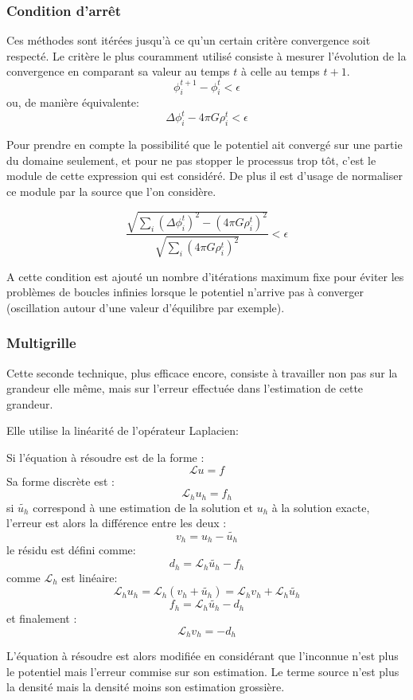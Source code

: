 \subsubsection{Condition d'arrêt}
Ces méthodes sont itérées jusqu’à ce qu'un certain critère convergence soit respecté. Le critère le plus couramment utilisé consiste à mesurer l'évolution de la convergence en comparant sa valeur au temps $t$ à celle au temps $t+1$.
\[ \phi^{t+1}_i - \phi^{t}_i < \epsilon \]
ou, de manière équivalente:
\[ \Delta \phi_i^t - 4 \pi G \rho^t_i< \epsilon \]

Pour prendre en compte la possibilité que le potentiel ait convergé sur une partie du domaine seulement, et pour ne pas stopper le processus trop tôt, c'est le module de cette expression qui est considéré. De plus il est d'usage de normaliser ce module par la source que l'on considère.

\[\dfrac{ \sqrt{  \sum_i \left (  \Delta \phi_i^t \right )^2 - \left (4 \pi G \rho^t_i  \right )^2 } }{\sqrt{  \sum_i  \left (4 \pi G \rho^t_i  \right )^2 } } < \epsilon \]

A cette condition est ajouté un nombre d'itérations maximum fixe pour éviter les problèmes de boucles infinies lorsque le potentiel n'arrive pas à converger (oscillation autour d'une valeur d'équilibre par exemple).

\subsubsection{Multigrille}
Cette seconde technique, plus efficace encore, consiste à travailler non pas sur la grandeur elle même, mais sur l'erreur effectuée dans l'estimation de cette grandeur.

Elle utilise la linéarité de l'opérateur Laplacien: 
 
Si l'équation à résoudre est de la forme : 
\[ \mathcal{L} u = f \]
Sa forme discrète est :\\
\[ \mathcal{L}_h u_h = f_h \]
si $\tilde{u_h}$ correspond à une estimation de la solution et $u_h$ à la solution exacte, l'erreur est alors la différence entre les deux : 
\[ v_h = u_h - \tilde{u_h} \]
le résidu est défini comme:
\[ d_h = \mathcal{L}_h \tilde{u_h} - f_h \]
comme $\mathcal{L}_h$ est linéaire:
\[ \mathcal{L}_h u_h = \mathcal{L}_h (v_h + \tilde{u_h} ) = \mathcal{L}_h v_h +\mathcal{L}_h \tilde{u_h} \]
\[ f_h   = \mathcal{L}_h \tilde{u_h} - d_h\]
et finalement :
\[ \mathcal{L}_h v_h = -d_h \]

L'équation à résoudre est alors modifiée en considérant que l'inconnue n'est plus le potentiel mais l'erreur commise sur son estimation. Le terme source n'est plus la densité mais la densité moins son estimation grossière.\\



